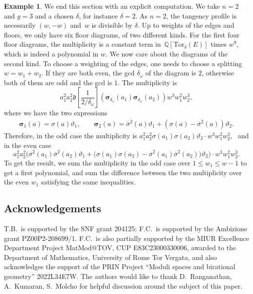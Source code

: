 \documentclass[pdftex]{sigma}
\newcommand{\Tor}{\mathrm{Tor}}
\renewcommand{\d}[1]{\dfk\left[ #1 \right]}
\newcommand{\QQ}{\mathbb{Q}}
\newcommand{\dfk}{\mathfrak{d}}
\numberwithin{equation}{section}
\theoremstyle{definition}
\newtheorem{expl}[theo]{Example}
\begin{document}
\begin{expl}
 We end this section with an explicit computation. We take $n=2$ and $g=3$ and a chosen $\delta$, for instance $\delta=2$. As $n=2$, the tangency profile is necessarily $(w,-w)$ and~$w$ is divisible by $\delta$. Up to weights of the edges and floors, we only have six floor diagrams, of two different kinds. For the first four floor diagrams, the multiplicity is a constant term in~$\QQ[\Tor_\delta(E)]$ times $w^9$, which is indeed a polynomial in $w$. We now care about the diagrams of the second kind. To choose a weighting of the edges, one needs to choose a splitting $w=w_1+w_2$. If they are both even, the gcd $\delta_\omega$ of the diagram is $2$, otherwise both of them are odd and the gcd is $1$. The multiplicity is
 \[ a_1^2a_2^2\d{\frac{1}{2/\delta_\omega}}\left(\boldsymbol{\sigma}_{\delta_\omega}(a_1)\boldsymbol{\sigma}_{\delta_\omega}(a_2)\right)w^3w_1^2w_2^3, \]
 where we have the two expressions
 \begin{align*}
 \boldsymbol{\sigma}_1(a) = \sigma(a)\vartheta_1, \qquad
 \boldsymbol{\sigma}_2(a) = \overline{\sigma}^2(a)\vartheta_1 + (\sigma(a)-\overline{\sigma}^2(a))\vartheta_2.
 \end{align*}
 Therefore, in the odd case the multiplicity is
$a_1^2a_2^2\sigma(a_1)\sigma(a_2)\vartheta_2\cdot w^3w_1^2w_2^3$, \
 and in the even case
 \[ a_1^2a_2^2\bigl(\overline{\sigma}^2(a_1)\overline{\sigma}^2(a_2)\vartheta_1 + \bigl(\sigma(a_1)\sigma(a_2) - \overline{\sigma}^2(a_1)\overline{\sigma}^2(a_2)\bigr)\vartheta_2 \bigr)\cdot w^3w_1^2w_2^3. \]
 To get the result, we sum the multiplicity in the odd case over $1\leqslant w_1\leqslant w-1$ to get a first polynomial, and sum the difference between the two multiplicity over the even $w_1$ satisfying the same inequalities.
\end{expl}

\subsection*{Acknowledgements}
 T.B.\ is supported by the SNF grant 204125; F.C.\ is supported by the Ambizione grant PZ00P2-208699/1. F.C.\ is also partially supported by the MIUR Excellence Department Project MatMod@TOV, CUP E83C23000330006, awarded to the Department of Mathematics, University of Rome Tor Vergata, and also acknowledges the support of the PRIN Project ``Moduli spaces and birational geometry'' 2022L34E7W.
The authors would like to thank D.~Ranganathan, A.~Kumaran, S.~Molcho for helpful discussion around the subject of this paper.
\end{document}
